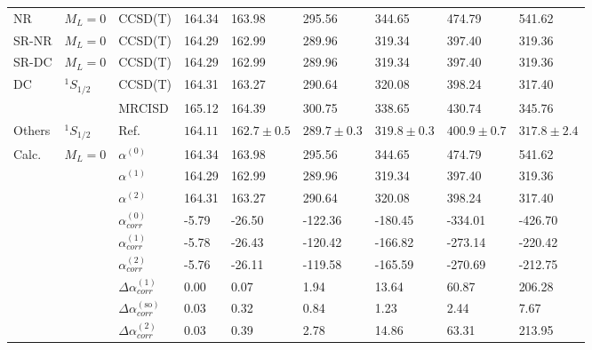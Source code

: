 \begin{longtable}{lllllllll}
\bottomrule
\endlastfoot
NR & $M_L=0$ & CCSD(T) &    164.34 &         163.98 &         295.56 &         344.65 &         474.79 &         541.62 \\
SR-NR & $M_L=0$ & CCSD(T) &    164.29 &         162.99 &         289.96 &         319.34 &         397.40 &         319.36 \\
SR-DC & $M_L=0$ & CCSD(T) &    164.29 &         162.99 &         289.96 &         319.34 &         397.40 &         319.36 \\
DC & $^1S_{1/2}$ & CCSD(T) &    164.31 &         163.27 &         290.64 &         320.08 &         398.24 &         317.40 \\
      &         & MRCISD &    165.12 &         164.39 &         300.75 &         338.65 &         430.74 &         345.76 \\
Others & $^1S_{1/2}$ & Ref. \cite{Schwerdtfeger2019} &  $164.11$ &  $162.7\pm0.5$ &  $289.7\pm0.3$ &  $319.8\pm0.3$ &  $400.9\pm0.7$ &  $317.8\pm2.4$ \\
Calc. & $M_L=0$ & $\alpha^{(0)}$ &    164.34 &         163.98 &         295.56 &         344.65 &         474.79 &         541.62 \\
      &         & $\alpha^{(1)}$ &    164.29 &         162.99 &         289.96 &         319.34 &         397.40 &         319.36 \\
      &         & $\alpha^{(2)}$ &    164.31 &         163.27 &         290.64 &         320.08 &         398.24 &         317.40 \\
      &         & $\alpha_{corr}^{(0)}$ &     -5.79 &         -26.50 &        -122.36 &        -180.45 &        -334.01 &        -426.70 \\
      &         & $\alpha_{corr}^{(1)}$ &     -5.78 &         -26.43 &        -120.42 &        -166.82 &        -273.14 &        -220.42 \\
      &         & $\alpha_{corr}^{(2)}$ &     -5.76 &         -26.11 &        -119.58 &        -165.59 &        -270.69 &        -212.75 \\
      &         & $\Delta \alpha_{corr}^{(\text{1})}$ &      0.00 &           0.07 &           1.94 &          13.64 &          60.87 &         206.28 \\
      &         & $\Delta \alpha_{corr}^{(\text{so})}$ &      0.03 &           0.32 &           0.84 &           1.23 &           2.44 &           7.67 \\
      &         & $\Delta \alpha_{corr}^{(\text{2})}$ &      0.03 &           0.39 &           2.78 &          14.86 &          63.31 &         213.95 \\

\end{longtable}
